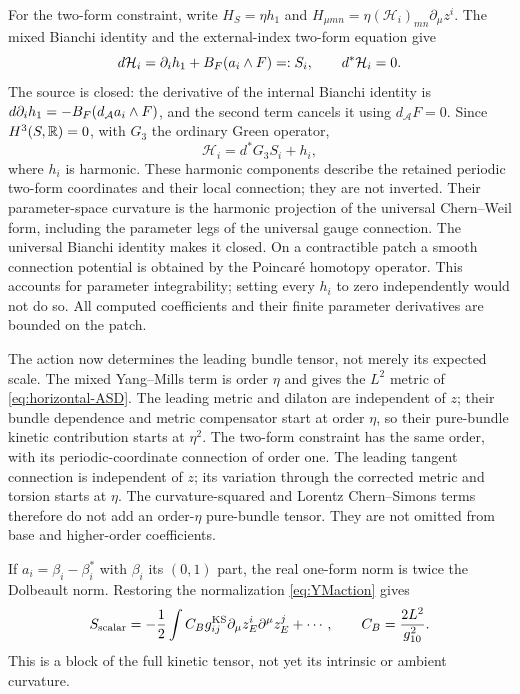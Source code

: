 For the two-form constraint, write $H_S=\eta h_1$ and
$H_{\mu mn}=\eta(\mathcal H_i)_{mn}\partial_\mu z^i$.
The mixed Bianchi identity and the external-index two-form equation
give
\begin{equation}\label{eq:Bconstraint}
 d\mathcal H_i=\partial_i h_1+B_F(a_i\wedge F)=:S_i,
 \qquad d^*\mathcal H_i=0.
\end{equation}
The source is closed: the derivative of the internal Bianchi
identity is $d\partial_i h_1=-B_F(d_{\mathcal A}a_i\wedge F)$,
and the second term cancels it using $d_{\mathcal A}F=0$.
Since $H^3(S,\mathbb R)=0$, with $G_3$ the ordinary Green operator,
\begin{equation}\label{eq:Bsolution}
 \mathcal H_i=d^*G_3S_i+h_i,
\end{equation}
where $h_i$ is harmonic. These harmonic components describe the
retained periodic two-form coordinates and their local connection;
they are not inverted. Their parameter-space curvature is the
harmonic projection of the universal Chern--Weil form, including
the parameter legs of the universal gauge connection. The universal
Bianchi identity makes it closed. On a contractible patch a smooth
connection potential is obtained by the Poincar\'e homotopy operator.
This accounts for parameter integrability; setting every $h_i$ to
zero independently would not do so. All computed coefficients
and their finite parameter derivatives are bounded on the patch.

The action now determines the leading bundle tensor, not merely its
expected scale. The mixed Yang--Mills term is order $\eta$ and gives
the $L^2$ metric of \eqref{eq:horizontal-ASD}. The leading metric and
dilaton are independent of $z$; their bundle dependence and metric
compensator start at order $\eta$, so their pure-bundle kinetic
contribution starts at $\eta^2$. The two-form constraint has the
same order, with its periodic-coordinate connection of order one.
The leading tangent connection is independent of $z$; its
variation through the corrected metric and torsion starts at
$\eta$. The curvature-squared and Lorentz Chern--Simons terms
therefore do not add an order-$\eta$ pure-bundle tensor. They are
not omitted from base and higher-order coefficients.

If $a_i=\beta_i-\beta_i^*$ with $\beta_i$ its $(0,1)$ part,
the real one-form norm is twice the Dolbeault norm. Restoring the
normalization \eqref{eq:YMaction} gives
\begin{equation}\label{eq:physicalmetric}
 S_{\rm scalar}=-\frac12\int C_Bg^{\mathrm{KS}}_{ij}
               \partial_\mu z_E^i\partial^\mu z_E^j+\cdots,
 \qquad C_B=\frac{2L^2}{g_{10}^2}.
\end{equation}
This is a block of the full kinetic tensor, not yet its intrinsic
or ambient curvature.


